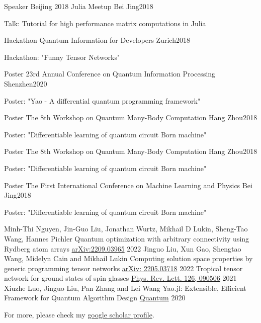 \documentclass[11pt, a4paper]{awesome-cv}
\begin{document}
\begin{cventries}
{\begin{cvitems}
    \end{cvitems}
    }
\cventry
    {Speaker}
    {Beijing 2018 Julia Meetup}
    {Bei Jing}{2018}
    {
    \begin{cvitems}
        Talk: Tutorial for high performance matrix computations in Julia
    \end{cvitems}
    }
\cventry
    {Hackathon}
    {Quantum Information for Developers}
    {Zurich}{2018}
    {
    \begin{cvitems}
        Hackathon: "Funny Tensor Networks"
    \end{cvitems}
    }
\cventry
    {Poster}
    {23rd Annual Conference on Quantum Information Processing}
    {Shenzhen}{2020}
    {
    \begin{cvitems}
        Poster: "Yao - A differential quantum programming framework"
    \end{cvitems}
    }
\cventry
    {Poster}
    {The 8th Workshop on Quantum Many-Body Computation}
    {Hang Zhou}{2018}
    {
    \begin{cvitems}
        Poster: "Differentiable learning of quantum circuit Born machine"
    \end{cvitems}
    }
\cventry
    {Poster}
    {The 8th Workshop on Quantum Many-Body Computation}
    {Hang Zhou}{2018}
    {
    \begin{cvitems}
        Poster: "Differentiable learning of quantum circuit Born machine"
    \end{cvitems}
    }

\cventry
    {Poster}
    {The First International Conference on Machine Learning and Physics}
    {Bei Jing}{2018}
    {
    \begin{cvitems}
        Poster: "Differentiable learning of quantum circuit Born machine"
    \end{cvitems}
    }
\end{cventries}

%
%
\begin{cventries}
  \cventry
    {Minh-Thi Nguyen, Jin-Guo Liu, Jonathan Wurtz, Mikhail D Lukin, Sheng-Tao Wang, Hannes Pichler} %
    {Quantum optimization with arbitrary connectivity using Rydberg atom arrays} %
    {\href{https://arxiv.org/abs/2209.03965}{arXiv:2209.03965}} %
    {2022} %
    {
    }
  \cventry
    {Jinguo Liu, Xun Gao, Shengtao Wang, Midelyn Cain and Mikhail Lukin} %
    {Computing solution space properties by generic programming tensor networks} %
    {\href{https://arxiv.org/abs/2205.03718}{arXiv: 2205.03718}} %
    {2022} %
    {}
  {Tropical tensor network for ground states of spin glasses}
    {\href{https://journals.aps.org/prl/abstract/10.1103/PhysRevLett.126.090506}{Phys. Rev. Lett. 126, 090506}}
  {2021}
  {
  }
  \cventry
    {Xiuzhe Luo, Jinguo Liu, Pan Zhang and Lei Wang} %
    {Yao.jl: Extensible, Efficient Framework for Quantum Algorithm Design} %
    {\href{https://quantum-journal.org/papers/q-2020-10-11-341/}{Quantum}} %
    {2020} %
    {
    }
\end{cventries}

For more, please check my \href{https://scholar.google.com/citations?view_op=list_works&hl=zh-CN&hl=zh-CN&user=4edw228AAAAJ&sortby=pubdate}{google scholar profile}.
\end{document}
